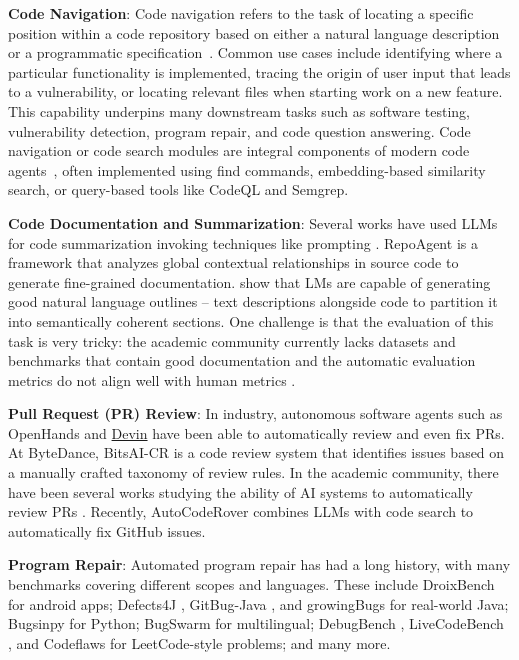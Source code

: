 \textbf{Code Navigation}:
Code navigation refers to the task of locating a specific position within a code repository based on either a natural language description~\citep{liu2024codexembedgeneralistembeddingmodel} or a programmatic specification~\citep{schafer2016ql}. 
Common use cases include identifying where a particular functionality is implemented, tracing the origin of user input that leads to a vulnerability, or locating relevant files when starting work on a new feature. 
This capability underpins many downstream tasks such as software testing, vulnerability detection, program repair, and code question answering. Code navigation or code search modules are integral components of modern code agents~\citep{yang2024sweagent, bouzenia2024repairagent, xia2024agentless}, often implemented using find commands, embedding-based similarity search, or query-based tools like CodeQL and Semgrep.

\textbf{Code Documentation and Summarization}: Several works have used LLMs for code summarization invoking techniques like prompting \citep{sun2024source, su2024distilled, haldar2024analyzing, ahmed2024automatic}. RepoAgent \citep{luo2024repoagent} is a framework that analyzes global contextual relationships in source code to generate fine-grained documentation. \citet{shi2024natural} show that LMs are capable of generating good natural language outlines -- text descriptions alongside code to partition it into semantically coherent sections. One challenge is that the evaluation of this task is very tricky: the academic community currently lacks datasets and benchmarks that contain good documentation and the automatic evaluation metrics do not align well with human metrics \citep{diggs2024leveraging}. 

\textbf{Pull Request (PR) Review}: In industry, autonomous software agents such as OpenHands \citep{openhands} and \href{https://app.devin.ai/}{Devin} have been able to automatically review and even fix PRs. At ByteDance, BitsAI-CR \citep{sun2025bitsai} is a code review system that identifies issues based on a manually crafted taxonomy of review rules. In the academic community, there have been several works studying the ability of AI systems to automatically review PRs \citep{tufano2021towards, tufano2022using, li2022automating, li2024utilizing}. Recently, AutoCodeRover \citep{zhang2024autocoderover} combines LLMs with code search to automatically fix GitHub issues.

\textbf{Program Repair}: 
Automated program repair has had a long history, with many benchmarks covering different scopes and languages. These include DroixBench \citep{tan2018repairing} for android apps; Defects4J \citep{just2014defects4j}, GitBug-Java \citep{gitbugjava}, and growingBugs \citep{GrowingBugsICSE21, GrowingBugsTSE2022, NaturalnessOfBugsFSE2022} for real-world Java; Bugsinpy \citep{widyasari2020bugsinpy} for Python; BugSwarm \citep{tomassi2019bugswarm} for multilingual; DebugBench \citep{hu2024leveraging}, LiveCodeBench \citep{jain2024livecodebenchholisticcontaminationfree}, and Codeflaws \citep{tan2017codeflaws} for LeetCode-style problems; and many more.

